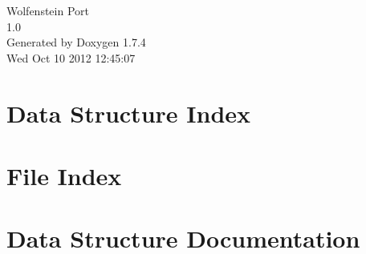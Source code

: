 \documentclass[a4paper]{book}
\begin{document}
\hypersetup{pageanchor=false}
\begin{titlepage}
\vspace*{7cm}
\begin{center}
{\Large Wolfenstein Port \\[1ex]\large 1.0 }\\
\vspace*{1cm}
{\large Generated by Doxygen 1.7.4}\\
\vspace*{0.5cm}
{\small Wed Oct 10 2012 12:45:07}\\
\end{center}
\end{titlepage}
\clearemptydoublepage
{}
\tableofcontents
\clearemptydoublepage
{}
\hypersetup{pageanchor=true}
\chapter{Data Structure Index}

\chapter{File Index}

\chapter{Data Structure Documentation}







































\end{document}
